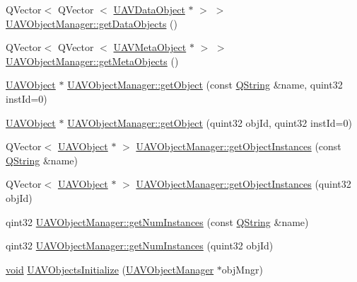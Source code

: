 \begin{DoxyCompactItemize}
\item 
\-Q\-Vector$<$ \-Q\-Vector\*
$<$ \hyperlink{class_u_a_v_data_object}{\-U\-A\-V\-Data\-Object} $\ast$ $>$ $>$ \hyperlink{group___u_a_v_objects_plugin_gaddd03a2027eb1ac4f3208d3fda7e76c9}{\-U\-A\-V\-Object\-Manager\-::get\-Data\-Objects} ()
\item 
\-Q\-Vector$<$ \-Q\-Vector\*
$<$ \hyperlink{class_u_a_v_meta_object}{\-U\-A\-V\-Meta\-Object} $\ast$ $>$ $>$ \hyperlink{group___u_a_v_objects_plugin_ga8c25b065c3e4f456b2e3a7913f6d764f}{\-U\-A\-V\-Object\-Manager\-::get\-Meta\-Objects} ()
\item 
\hyperlink{class_u_a_v_object}{\-U\-A\-V\-Object} $\ast$ \hyperlink{group___u_a_v_objects_plugin_gada44cdbfa55a281b78d41abcc6834dc0}{\-U\-A\-V\-Object\-Manager\-::get\-Object} (const \hyperlink{group___u_a_v_objects_plugin_gab9d252f49c333c94a72f97ce3105a32d}{\-Q\-String} \&name, quint32 inst\-Id=0)
\item 
\hyperlink{class_u_a_v_object}{\-U\-A\-V\-Object} $\ast$ \hyperlink{group___u_a_v_objects_plugin_ga6d299736b20c625d2553f80123e71e7a}{\-U\-A\-V\-Object\-Manager\-::get\-Object} (quint32 obj\-Id, quint32 inst\-Id=0)
\item 
\-Q\-Vector$<$ \hyperlink{class_u_a_v_object}{\-U\-A\-V\-Object} $\ast$ $>$ \hyperlink{group___u_a_v_objects_plugin_ga575678dce0852cc3843610477ea587ff}{\-U\-A\-V\-Object\-Manager\-::get\-Object\-Instances} (const \hyperlink{group___u_a_v_objects_plugin_gab9d252f49c333c94a72f97ce3105a32d}{\-Q\-String} \&name)
\item 
\-Q\-Vector$<$ \hyperlink{class_u_a_v_object}{\-U\-A\-V\-Object} $\ast$ $>$ \hyperlink{group___u_a_v_objects_plugin_gaa1134c6f38b27868f8f61c6e2aaae4f5}{\-U\-A\-V\-Object\-Manager\-::get\-Object\-Instances} (quint32 obj\-Id)
\item 
qint32 \hyperlink{group___u_a_v_objects_plugin_gab285ecd0299f701264d624cad6e51ef1}{\-U\-A\-V\-Object\-Manager\-::get\-Num\-Instances} (const \hyperlink{group___u_a_v_objects_plugin_gab9d252f49c333c94a72f97ce3105a32d}{\-Q\-String} \&name)
\item 
qint32 \hyperlink{group___u_a_v_objects_plugin_ga22601fef22bd4c4ba1c48e07b70e8ddb}{\-U\-A\-V\-Object\-Manager\-::get\-Num\-Instances} (quint32 obj\-Id)
\item 
\hyperlink{group___u_a_v_objects_plugin_ga444cf2ff3f0ecbe028adce838d373f5c}{void} \hyperlink{group___u_a_v_objects_plugin_gaa5848573445b2e80691402f8bd9d2257}{\-U\-A\-V\-Objects\-Initialize} (\hyperlink{class_u_a_v_object_manager}{\-U\-A\-V\-Object\-Manager} $\ast$obj\-Mngr)

\end{DoxyCompactItemize}
